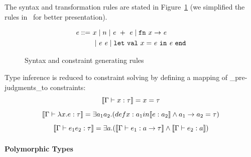 The syntax and transformation rules are stated in
Figure~\ref{figure:ml-constraints} (we simplified the rules
in~\cite{haack:slicing} for better presentation).

\begin{figure}
\hfil
\begin{minipage}{2.3in}
\begin{align*}
\expr ::=  & x \mid n \mid \expr  +   \expr \mid \fn  x \rightarrow \expr \\
        & \mid \expr  \expr \mid \kwlet  \val  x = \expr  \kwin 
	\expr  \kwend
\end{align*}

\end{minipage}
\hfil
\caption{Syntax and constraint generating rules}
\label{figure:ml-constraints}
\end{figure}


Type inference is reduced to constraint solving by defining a mapping
of _pre-judgments_to constraints:
\[\llbracket \Gamma \vdash x:\tau \rrbracket = x =\tau\]
\[\llbracket \Gamma \vdash \lambda x.e:\tau \rrbracket = \exists a_1 a_2.
(def x: a_1 in \llbracket e:a_2 \rrbracket \land a_1 \rightarrow a_2 =\tau)\]
\[\llbracket \Gamma\vdash e_1 e_2 : \tau \rrbracket = \exists a.(\llbracket \Gamma \vdash
e_1:a\rightarrow \tau \rrbracket\land \llbracket \Gamma\vdash e_2:a \rrbracket)\]


\paragraph{Polymorphic Types}


